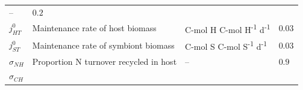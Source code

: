 \documentclass[]{elsarticle} %
\begin{document}
\begin{longtable}[]{@{}llll@{}}
\begin{minipage}[t]{0.24\columnwidth}
--\strut
\end{minipage} & \begin{minipage}[t]{0.12\columnwidth}\raggedright\strut
\(0.2\)\strut
\end{minipage}\tabularnewline
\begin{minipage}[t]{0.09\columnwidth}\raggedright\strut
\(j_{HT}^0\)\strut
\end{minipage} & \begin{minipage}[t]{0.44\columnwidth}\raggedright\strut
Maintenance rate of host biomass\strut
\end{minipage} & \begin{minipage}[t]{0.24\columnwidth}\raggedright\strut
C-mol H C-mol H\textsuperscript{-1} d\textsuperscript{-1}\strut
\end{minipage} & \begin{minipage}[t]{0.12\columnwidth}\raggedright\strut
\(0.03\)\strut
\end{minipage}\tabularnewline
\begin{minipage}[t]{0.09\columnwidth}\raggedright\strut
\(j_{ST}^0\)\strut
\end{minipage} & \begin{minipage}[t]{0.44\columnwidth}\raggedright\strut
Maintenance rate of symbiont biomass\strut
\end{minipage} & \begin{minipage}[t]{0.24\columnwidth}\raggedright\strut
C-mol S C-mol S\textsuperscript{-1} d\textsuperscript{-1}\strut
\end{minipage} & \begin{minipage}[t]{0.12\columnwidth}\raggedright\strut
\(0.03\)\strut
\end{minipage}\tabularnewline
\begin{minipage}[t]{0.09\columnwidth}\raggedright\strut
\(\sigma_{NH}\)\strut
\end{minipage} & \begin{minipage}[t]{0.44\columnwidth}\raggedright\strut
Proportion N turnover recycled in host\strut
\end{minipage} & \begin{minipage}[t]{0.24\columnwidth}\raggedright\strut
--\strut
\end{minipage} & \begin{minipage}[t]{0.12\columnwidth}\raggedright\strut
\(0.9\)\strut
\end{minipage}\tabularnewline
\begin{minipage}[t]{0.09\columnwidth}\raggedright\strut
\(\sigma_{CH}\)\strut

\end{minipage}
\end{longtable}
\end{document}
